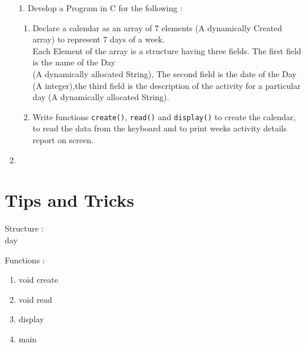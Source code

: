 \documentclass{article}
\newcommand{\answer}{\item [$\rightarrow$]}
\begin{document}
	\begin{enumerate}
		\item [1.] Develop a Program in C for the following :
		\begin{enumerate}[label=\alph*.]
			\item Declare a calendar as an array of 7 elements (A dynamically Created array) to represent 7 days of a week. \\
			Each Element of the array is a structure having three
			fields. The first field is the name of the Day \\
			(A dynamically allocated String),
			The second field is the date of the Day (A integer),the third field is the
			description of the activity for a particular day (A dynamically allocated String).
			\item Write functions \verb|create()|, \verb|read()| and \verb|display()| to create the calendar, to read the data from the keyboard and to print weeks activity  details report on screen.
		\end{enumerate}
		\answer \inputminted{c}{../../Program1.c}
	\end{enumerate} \newpage

	\section*{Tips and Tricks}
	Structure : \\ day
	
	\noindent Functions : 
	\begin{enumerate}
		\item void create
		\item void read
		\item display
		\item main
	\end{enumerate}
\end{document}
